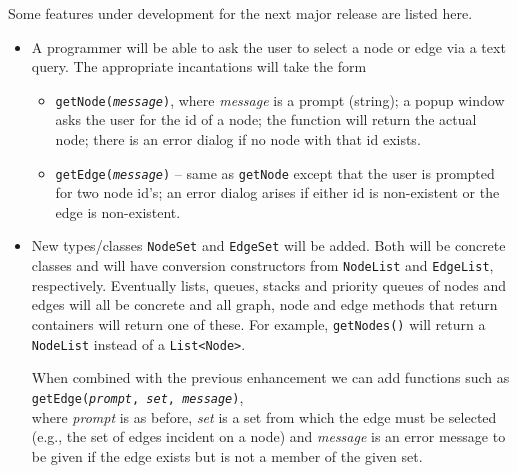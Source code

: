 Some features under development for the next major release are listed here.

\begin{itemize}
\item
  A programmer will be able to ask the user to select a node or edge via a text query. The appropriate incantations will take the form
  \begin{itemize}
    \item \texttt{getNode(\emph{message})}, where \emph{message} is a prompt
      (string); a popup window asks the user for the id of a node; the
      function will return the actual node; there is an error dialog if
      no node with that id exists.
    \item \texttt{getEdge(\emph{message})} -- same as \texttt{getNode}
      except that the user is prompted for two node id's; an error dialog
      arises if either id is non-existent or the edge is non-existent.
  \end{itemize}

\item
  New types/classes \texttt{NodeSet} and \texttt{EdgeSet} will be added. Both
  will be concrete classes and will have conversion constructors from
  \texttt{NodeList} and \texttt{EdgeList}, respectively. Eventually
  lists, queues, stacks and priority queues of nodes and edges will all be
  concrete and all graph, node and edge methods that return containers will
  return one of these. For example, \texttt{getNodes()} will return a
  \texttt{NodeList} instead of a \texttt{List<Node>}.

  When combined with the previous enhancement we can add functions such as\\
  \hspace*{2em}\mbox{\texttt{getEdge(\emph{prompt}, \emph{set}, \emph{message})}},\\
  where \emph{prompt} is as before, \emph{set} is
  a set from which the edge must be selected (e.g., the set of edges incident
  on a node) and \emph{message} is an error message to be given if the
  edge exists but is not a member of the given set.
\end{itemize}
